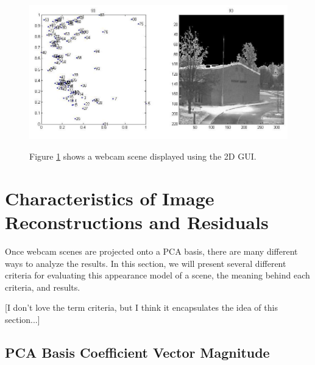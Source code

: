 \begin{figure}[ht]
	\centering
		\includegraphics[width=1\textwidth]{figures/2dGui.jpg}
	\label{fig:2dGui}
	
		\caption[Exploring 2D image space using a simple GUI.]{Figure \ref{fig:2dGui} shows a webcam scene displayed using the 2D GUI.}
\end{figure}


\section{Characteristics of Image Reconstructions and Residuals}

Once webcam scenes are projected onto a PCA basis, there are many different ways to analyze the results.  In this section, we will present several different criteria for evaluating this appearance model of a scene, the meaning behind each criteria, and results.

[I don't love the term criteria, but I think it encapsulates the idea of this section...]

\subsection{PCA Basis Coefficient Vector Magnitude}

